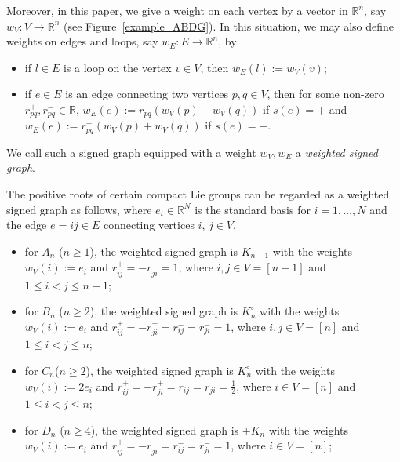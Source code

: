 \documentclass{amsart}
\theoremstyle{definition}
\theoremstyle{remark}
\numberwithin{equation}{section}
\begin{document}
Moreover, in this paper, we give a weight on each vertex by a vector in $\mathbb{R}^{n}$, say $w_{V}:V\to \mathbb{R}^{n}$ (see Figure~\ref{example_ABDG}).
In this situation, we may also define weights on edges and loops, say $w_{E}:E\to \mathbb{R}^{n}$, by 
\begin{itemize}
\item if $l\in E$ is a loop on the vertex $v\in V$, then $w_{E}(l):=w_{V}(v)$;
\item if $e\in E$ is an edge connecting two vertices $p,q\in V$, then for some non-zero $r^{+}_{pq}, r^{-}_{pq}\in \mathbb{R}$, $w_{E}(e):=r^{+}_{pq}(w_{V}(p)-w_{V}(q))$ if $s(e)=+$ and $w_{E}(e):=r^{-}_{pq}(w_{V}(p)+w_{V}(q))$ if $s(e)=-$. 
\end{itemize}
We call such a signed graph equipped with a weight $w_{V}, w_{E}$ a {\it weighted signed graph}.

The positive roots of certain compact Lie groups can be regarded as a weighted signed graph as follows, where $e_{i}\in \mathbb{R}^{N}$ is the standard basis for $i=1,\ldots, N$ and the edge $e=ij\in E$ connecting vertices $i$, $j\in V$.
\begin{itemize}
\item for $A_{n}$ ($n\ge 1$), the weighted signed graph is $K_{n+1}$ with the weights $w_{V}(i):=e_{i}$ and $r^{+}_{ij}=-r^{+}_{ji}=1$, where $i,j\in V=[n+1]$ and $1\le i<j\le n+1$;
\item for $B_{n}$ ($n\ge 2$), the weighted signed graph is $K_{n}^{\circ}$ with the weights $w_{V}(i):=e_{i}$ and $r_{ij}^{+}=-r^{+}_{ji}=r_{ij}^{-}=r_{ji}^{-}=1$, where $i, j\in V=[n]$ and $1\le i<j\le n$;
\item for $C_{n}$($n\ge 2$), the weighted signed graph is $K_{n}^{\circ}$ with the weights $w_{V}(i):=2e_{i}$ and $r_{ij}^{+}=-r^{+}_{ji}=r_{ij}^{-}=r_{ji}^{-}=\frac{1}{2}$, where $i\in V=[n]$ and $1\le i<j\le n$;
\item for $D_{n}$ ($n\ge 4$), the weighted signed graph is $\pm K_{n}$ with the weights $w_{V}(i):=e_{i}$ and $r_{ij}^{+}=-r^{+}_{ji}=r_{ij}^{-}=r_{ji}^{-}=1$, where $i\in V=[n]$;
\end{itemize}
\end{document}
